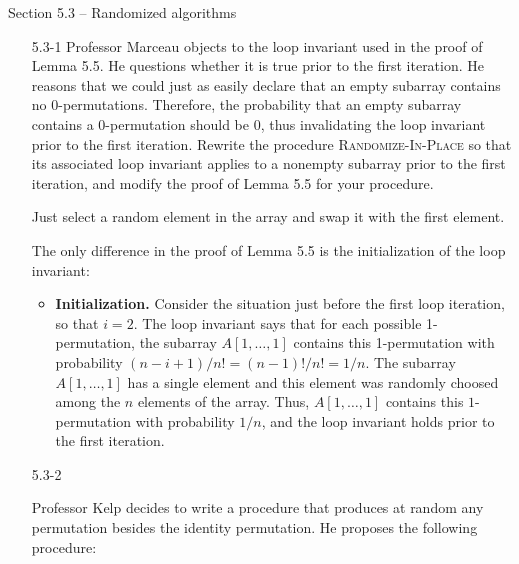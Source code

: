 \newpage

{\large Section 5.3 {--} Randomized algorithms}

\begin{enumerate}

\item[5.3{-}1]{Professor Marceau objects to the loop invariant used in the proof
of Lemma 5.5. He questions whether it is true prior to the first iteration. He
reasons that we could just as easily declare that an empty subarray contains
no 0-permutations. Therefore, the probability that an empty subarray
contains a 0-permutation should be 0, thus invalidating the loop invariant
prior to the first iteration. Rewrite the procedure \textsc{Randomize-In-Place}
so that its associated loop invariant applies to a nonempty subarray prior
to the first iteration, and modify the proof of Lemma 5.5 for your procedure.}

\begin{framed}
Just select a random element in the array and swap it with the first element.

\begin{algorithm}[H]
\SetAlgoNoEnd\DontPrintSemicolon
\BlankLine
\end{algorithm}

The only difference in the proof of Lemma 5.5 is the initialization of the loop
invariant:
\begin{itemize}
  \item \textbf{Initialization.} Consider the situation just before the first
    loop iteration, so that $i = 2$. The loop invariant says that for each
    possible 1-permutation, the subarray $A[1, \dots, 1]$ contains this
    1-permutation with probability $(n - i + 1)/n! = (n - 1)!/n! = 1/n$. The
    subarray $A[1, \dots, 1]$ has a single element and this element was
    randomly choosed among the $n$ elements of the array. Thus, $A[1, \dots, 1]$
    contains this $1$-permutation with probability $1/n$, and the loop invariant
    holds prior to the first iteration.
\end{itemize}
\end{framed}

\item[5.3{-}2]{Professor Kelp decides to write a procedure that produces at
random any permutation besides the identity permutation. He proposes the
following procedure:

}
\end{enumerate}

